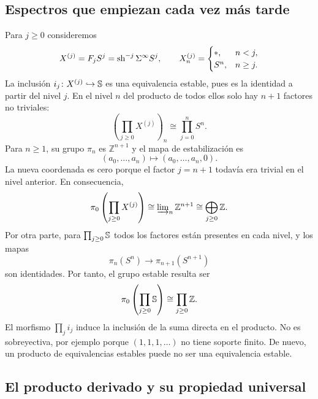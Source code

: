 \subsection{Espectros que empiezan cada vez más tarde}

\begin{ejem}
Para $j\ge0$ consideremos
\[
X^{(j)}=F_jS^j=\operatorname{sh}^{-j}\Sigma^\infty S^j,\qquad
X^{(j)}_n=\begin{cases}*,&n<j,\\S^n,&n\ge j.\end{cases}
\]
La inclusión $i_j\colon X^{(j)}\hookrightarrow\mathbb{S}$ es una equivalencia estable, pues es la identidad a partir del nivel $j$. En el nivel $n$ del producto de todos ellos solo hay $n+1$ factores no triviales:
\[
\left(\prod_{j\ge0}X^{(j)}\right)_n\cong\prod_{j=0}^nS^n.
\]
Para $n\ge1$, su grupo $\pi_n$ es $\mathbb Z^{n+1}$ y el mapa de estabilización es
\[
(a_0,\ldots,a_n)\longmapsto(a_0,\ldots,a_n,0).
\]
La nueva coordenada es cero porque el factor $j=n+1$ todavía era trivial en el nivel anterior. En consecuencia,
\[
\pi_0\left(\prod_{j\ge0}X^{(j)}\right)
\cong\varinjlim\nolimits_n\mathbb Z^{n+1}\cong\bigoplus_{j\ge0}\mathbb Z.
\]
Por otra parte, para $\prod_{j\ge0}\mathbb{S}$ todos los factores están presentes en cada nivel, y los mapas
\[
\pi_n(S^n)\to\pi_{n+1}(S^{n+1})
\]
son identidades. Por tanto, el grupo estable resulta ser
\[
\pi_0\left(\prod_{j\ge0}\mathbb{S}\right)\cong\prod_{j\ge0}\mathbb Z.
\]
El morfismo $\prod_ji_j$ induce la inclusión de la suma directa en el producto. No es sobreyectiva, por ejemplo porque $(1,1,1,\ldots)$ no tiene soporte finito. De nuevo, un producto de equivalencias estables puede no ser una equivalencia estable.
\end{ejem}

\subsection{El producto derivado y su propiedad universal}


